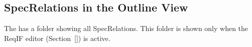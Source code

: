 \subsection{SpecRelations in the Outline View}
\label{sec:links-outline}

The  has a folder showing all SpecRelations. This folder is shown only when the ReqIF editor (Section~\ref{}) is active.

